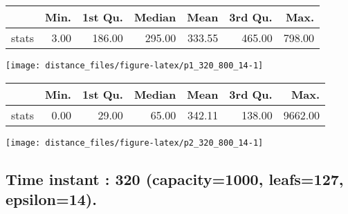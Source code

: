 \documentclass[
  9pt,
  landscape]{article}
\begin{document}
\begin{minipage}{0.5\textwidth} 
\centering 
\begin{tabular}{rrrrrrr}
  \hline
 & Min. & 1st Qu. & Median & Mean & 3rd Qu. & Max. \\ 
  \hline
stats & 3.00 & 186.00 & 295.00 & 333.55 & 465.00 & 798.00 \\ 
   \hline
\end{tabular}
\vspace{0.5cm} 


\texttt{[image: distance\_files/figure-latex/p1\_320\_800\_14-1]} 

\end{minipage} 
\begin{minipage}{0.5\textwidth} 
\centering 
\begin{tabular}{rrrrrrr}
  \hline
 & Min. & 1st Qu. & Median & Mean & 3rd Qu. & Max. \\ 
  \hline
stats & 0.00 & 29.00 & 65.00 & 342.11 & 138.00 & 9662.00 \\ 
   \hline
\end{tabular}
\vspace{0.5cm} 


\texttt{[image: distance\_files/figure-latex/p2\_320\_800\_14-1]} 

\end{minipage}

\pagebreak

\hypertarget{time-instant-320-capacity1000-leafs127-epsilon14.}{%
\subsection{Time instant : 320 (capacity=1000, leafs=127,
epsilon=14).}\label{time-instant-320-capacity1000-leafs127-epsilon14.}}
\end{document}
